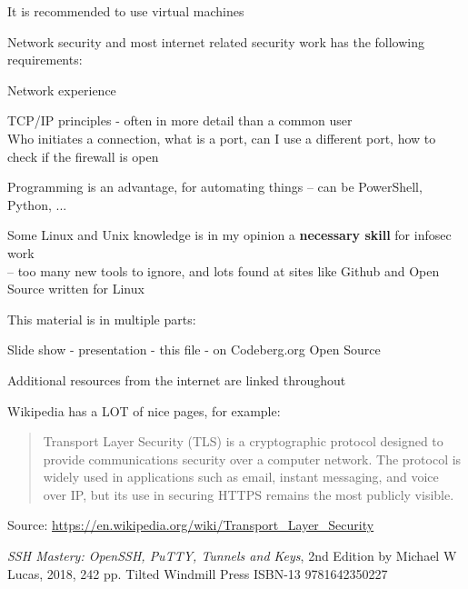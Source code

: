 \documentclass[Screen16to9,17pt]{foils}
\begin{document}
\begin{list1}
\item It is recommended to use virtual machines
\item Network security and most internet related security work has the following requirements:
\begin{list2}
\item Network experience
\item TCP/IP principles - often in more detail than a common user\\
Who initiates a connection, what is a port, can I use a different port, how to check if the firewall is open
\item Programming is an advantage, for automating things -- can be PowerShell, Python, ...
\item Some Linux and Unix knowledge is in my opinion a {\bf necessary skill} for infosec work\\
-- too many new tools to ignore, and lots found at sites like Github and Open Source written for Linux
\end{list2}
\end{list1}



This material is in multiple parts:
\begin{list2}
\item Slide show - presentation - this file - on Codeberg.org Open Source
\item Additional resources from the internet are linked throughout
\item Wikipedia has a LOT of nice pages, for example:
\end{list2}

\begin{quote}\small
Transport Layer Security (TLS) is a cryptographic protocol designed to provide communications security over a computer network. The protocol is widely used in applications such as email, instant messaging, and voice over IP, but its use in securing HTTPS remains the most publicly visible.
\end{quote}
Source: \url{https://en.wikipedia.org/wiki/Transport_Layer_Security}



\emph{SSH Mastery: OpenSSH, PuTTY, Tunnels and Keys}, 2nd Edition
by Michael W Lucas, 2018,
242 pp.
Tilted Windmill Press
ISBN-13 9781642350227
\end{document}

